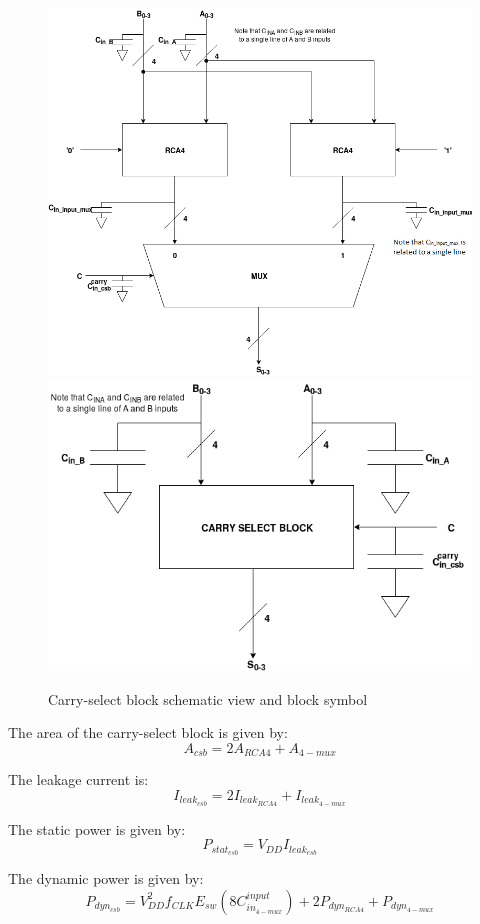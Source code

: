 \begin{figure}[H]
\centering
\includegraphics[width = 6 cm, height = 7 cm]{pentium/carry_select_adder_schematic.png}
\includegraphics[width = 6 cm, height = 7 cm]{pentium/carry_select_adder_black_box.png} 
\caption{Carry-select block schematic view and block symbol}
\label{fig:carry_select_schematic_bb}
\end{figure}

The area of the carry-select block is given by:
\begin{equation}
A_{csb} = 2A_{RCA4} + A_{4-mux} 
\end{equation}

The leakage current is:
\begin{equation}
I_{leak_{csb}} = 2I_{leak_{RCA4}} + I_{leak_{4-mux}}
\end{equation}

The static power is given by:
\begin{equation}
P_{stat_{csb}} = V_{DD} I_{leak_{csb}} 
\end{equation}

The dynamic power is given by:
\begin{equation}
P_{dyn_{csb}} = V_{DD}^2 f_{CLK} E_{sw} (8 C_{in_{4-mux}}^{input}) + 2P_{dyn_{RCA4}} + P_{dyn_{4-mux}}
\end{equation}

